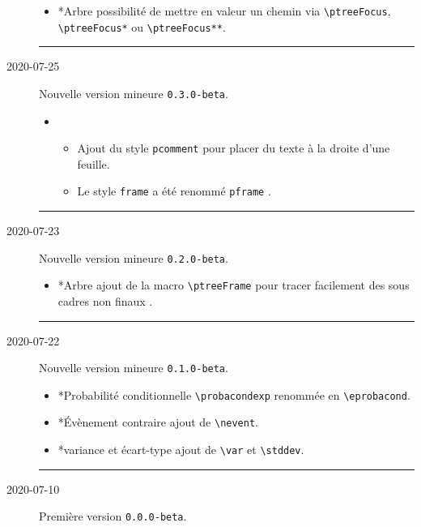 \documentclass[12pt,a4paper]{article}
\makeatletter
\newcommand\env[1]{\texttt{#1}}
\newcommand\macro[1]{\env{\textbackslash{}#1}}
\theoremstyle{definition}
\newcommand\separation{
	\medskip
	\hfill\rule{0.5\textwidth}{0.75pt}\hfill
	\medskip
}
\newcommand\prefix[1]{%
	\texttt{#1}%
}
\newcommand\topic{\@ifstar{\@topic@star}{\@topic@no@star}}
\newcommand\@topic@no@star[1]{%
	\textbf{\textsc{#1}.}%
}
\newcommand\@topic@star[1]{%
	\textbf{\textsc{#1} :}%
}
\makeatother
\begin{document}
\begin{description}
    \begin{itemize}[itemsep=.5em]
        \item \topic*{Arbre}
        	  possibilité de mettre en valeur un chemin via \macro{ptreeFocus},  \macro{ptreeFocus*} ou \macro{ptreeFocus**}.
    \end{itemize}
    
    \separation

    \medskip
    \item[2020-07-25] Nouvelle version mineure \verb+0.3.0-beta+.
    
    \begin{itemize}[itemsep=.5em]
        \item \topic{Arbre}
        \begin{itemize}[itemsep=.5em]
            \item Ajout du style \prefix{pcomment} pour placer du texte à la droite d'une feuille.
    
            \item Le style \prefix{frame} a été renommé \prefix{pframe}.
        \end{itemize}
    \end{itemize}
    
    \separation

    \medskip
    \item[2020-07-23] Nouvelle version mineure \verb+0.2.0-beta+.
    
    \begin{itemize}[itemsep=.5em]
        \item \topic*{Arbre}
              ajout de la macro \macro{ptreeFrame} pour tracer facilement des sous cadres non \og finaux \fg.
    \end{itemize}
    
    \separation

    \medskip
    \item[2020-07-22] Nouvelle version mineure \verb+0.1.0-beta+.
    
    \begin{itemize}[itemsep=.5em]
        \item \topic*{Probabilité conditionnelle}
              \macro{probacondexp} renommée en  \macro{eprobacond}.
    
        \item \topic*{Évènement contraire}
              ajout de \macro{nevent}.
    
        \item \topic*{variance et écart-type}
              ajout de \macro{var} et \macro{stddev}.
    \end{itemize}
    
    \separation

    \medskip
    \item[2020-07-10] Première version \verb+0.0.0-beta+.

\end{description}
\end{document}
